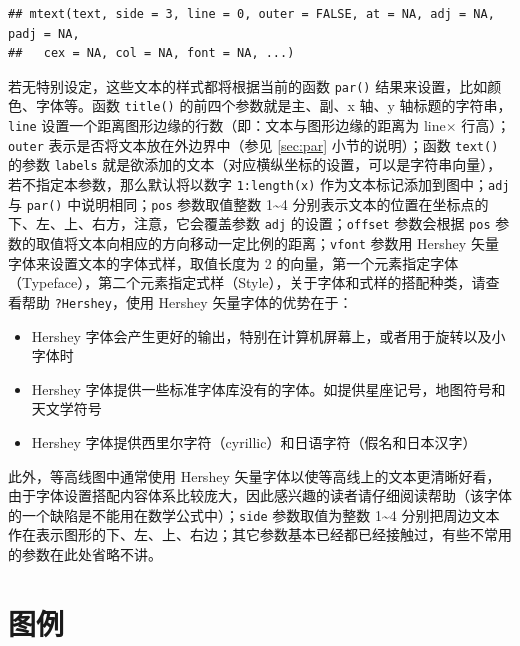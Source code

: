 \documentclass[
  b5paper,
  UTF8,twoside]{book}
\providecommand{\tightlist}{%
  \setlength{\itemsep}{0pt}\setlength{\parskip}{0pt}}
\begin{document}
\begin{verbatim}
## mtext(text, side = 3, line = 0, outer = FALSE, at = NA, adj = NA, padj = NA,
##   cex = NA, col = NA, font = NA, ...)
\end{verbatim}

若无特别设定，这些文本的样式都将根据当前的函数 \texttt{par()} 结果来设置，比如颜色、字体等。函数 \texttt{title()} 的前四个参数就是主、副、x 轴、y 轴标题的字符串，\texttt{line} 设置一个距离图形边缘的行数（即：文本与图形边缘的距离为 line\(\times\) 行高）；\texttt{outer} 表示是否将文本放在外边界中（参见 \ref{sec:par} 小节的说明）；函数 \texttt{text()} 的参数 \texttt{labels} 就是欲添加的文本（对应横纵坐标的设置，可以是字符串向量），若不指定本参数，那么默认将以数字 \texttt{1:length(x)} 作为文本标记添加到图中；\texttt{adj} 与 \texttt{par()} 中说明相同；\texttt{pos} 参数取值整数 1\textasciitilde4 分别表示文本的位置在坐标点的下、左、上、右方，注意，它会覆盖参数 \texttt{adj} 的设置；\texttt{offset} 参数会根据 \texttt{pos} 参数的取值将文本向相应的方向移动一定比例的距离；\texttt{vfont} 参数用 Hershey 矢量字体来设置文本的字体式样，取值长度为 2 的向量，第一个元素指定字体（Typeface），第二个元素指定式样（Style），关于字体和式样的搭配种类，请查看帮助 \texttt{?Hershey}，使用 Hershey 矢量字体的优势在于：

\begin{itemize}
\tightlist
\item
  Hershey 字体会产生更好的输出，特别在计算机屏幕上，或者用于旋转以及小字体时
\item
  Hershey 字体提供一些标准字体库没有的字体。如提供星座记号，地图符号和天文学符号
\item
  Hershey 字体提供西里尔字符（cyrillic）和日语字符（假名和日本汉字）
\end{itemize}

此外，等高线图中通常使用 Hershey 矢量字体以使等高线上的文本更清晰好看，由于字体设置搭配内容体系比较庞大，因此感兴趣的读者请仔细阅读帮助（该字体的一个缺陷是不能用在数学公式中）；\texttt{side} 参数取值为整数 1\textasciitilde4 分别把周边文本作在表示图形的下、左、上、右边；其它参数基本已经都已经接触过，有些不常用的参数在此处省略不讲。

\section{图例}\label{sec:legend}
\end{document}

